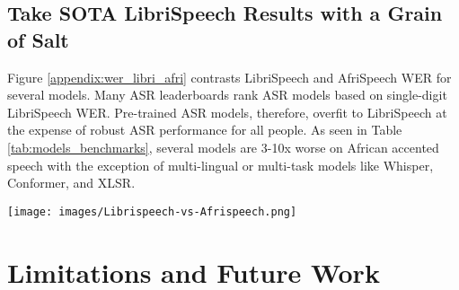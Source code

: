 \documentclass[11pt,a4paper]{article}
\begin{document}




\subsection{Take SOTA LibriSpeech Results with a Grain of Salt}  Figure \ref{appendix:wer_libri_afri} contrasts LibriSpeech and AfriSpeech WER for several models. Many ASR leaderboards rank ASR models based on single-digit LibriSpeech \citep{panayotov2015librispeech} WER. Pre-trained ASR models, therefore, overfit to LibriSpeech at the expense of robust ASR performance for all people. As seen in Table \ref{tab:models_benchmarks}, several models are 3-10x worse on African accented speech with the exception of multi-lingual or multi-task models like Whisper, Conformer, and XLSR. %

\begin{figure*}%
\texttt{[image: images/Librispeech-vs-Afrispeech.png]} %
\centering
\caption{WER on LibriSpeech vs AfriSpeech for selected pre-trained models and commercial ASR systems.}
\label{appendix:wer_libri_afri}
\end{figure*}

\section{Limitations and Future Work}
\end{document}
